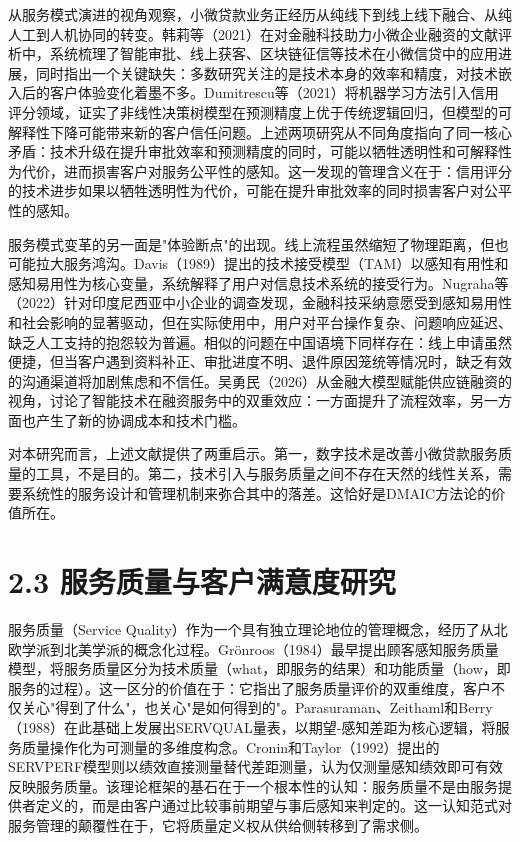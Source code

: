 从服务模式演进的视角观察，小微贷款业务正经历从纯线下到线上线下融合、从纯人工到人机协同的转变。韩莉等（2021）在对金融科技助力小微企业融资的文献评析中，系统梳理了智能审批、线上获客、区块链征信等技术在小微信贷中的应用进展，同时指出一个关键缺失：多数研究关注的是技术本身的效率和精度，对技术嵌入后的客户体验变化着墨不多\cite{ref9}。Dumitrescu等（2021）将机器学习方法引入信用评分领域，证实了非线性决策树模型在预测精度上优于传统逻辑回归，但模型的可解释性下降可能带来新的客户信任问题\cite{ref24}。上述两项研究从不同角度指向了同一核心矛盾：技术升级在提升审批效率和预测精度的同时，可能以牺牲透明性和可解释性为代价，进而损害客户对服务公平性的感知。这一发现的管理含义在于：信用评分的技术进步如果以牺牲透明性为代价，可能在提升审批效率的同时损害客户对公平性的感知。\par

服务模式变革的另一面是"体验断点"的出现。线上流程虽然缩短了物理距离，但也可能拉大服务鸿沟。Davis（1989）提出的技术接受模型（TAM）以感知有用性和感知易用性为核心变量，系统解释了用户对信息技术系统的接受行为\cite{ref25}。Nugraha等（2022）针对印度尼西亚中小企业的调查发现，金融科技采纳意愿受到感知易用性和社会影响的显著驱动，但在实际使用中，用户对平台操作复杂、问题响应延迟、缺乏人工支持的抱怨较为普遍\cite{ref26}。相似的问题在中国语境下同样存在：线上申请虽然便捷，但当客户遇到资料补正、审批进度不明、退件原因笼统等情况时，缺乏有效的沟通渠道将加剧焦虑和不信任。吴勇民（2026）从金融大模型赋能供应链融资的视角，讨论了智能技术在融资服务中的双重效应：一方面提升了流程效率，另一方面也产生了新的协调成本和技术门槛\cite{ref27}。\par

对本研究而言，上述文献提供了两重启示。第一，数字技术是改善小微贷款服务质量的工具，不是目的。第二，技术引入与服务质量之间不存在天然的线性关系，需要系统性的服务设计和管理机制来弥合其中的落差。这恰好是DMAIC方法论的价值所在。\par

\section{2.3 服务质量与客户满意度研究}

服务质量（Service Quality）作为一个具有独立理论地位的管理概念，经历了从北欧学派到北美学派的概念化过程。Grönroos（1984）最早提出顾客感知服务质量模型，将服务质量区分为技术质量（what，即服务的结果）和功能质量（how，即服务的过程）。这一区分的价值在于：它指出了服务质量评价的双重维度，客户不仅关心"得到了什么"，也关心"是如何得到的"。Parasuraman、Zeithaml和Berry（1988）在此基础上发展出SERVQUAL量表，以期望-感知差距为核心逻辑，将服务质量操作化为可测量的多维度构念\cite{ref14}。Cronin和Taylor（1992）提出的SERVPERF模型则以绩效直接测量替代差距测量，认为仅测量感知绩效即可有效反映服务质量\cite{ref29}。该理论框架的基石在于一个根本性的认知：服务质量不是由服务提供者定义的，而是由客户通过比较事前期望与事后感知来判定的。这一认知范式对服务管理的颠覆性在于，它将质量定义权从供给侧转移到了需求侧。\par

